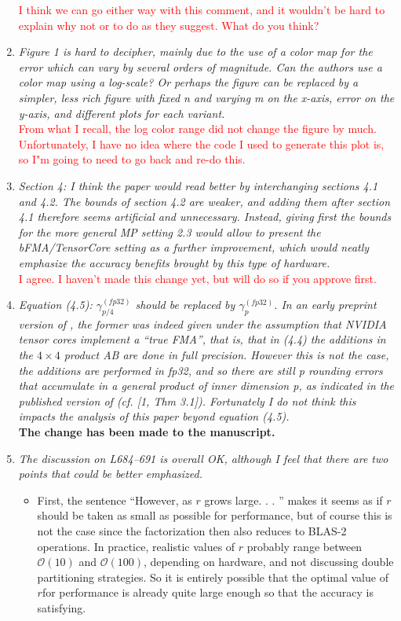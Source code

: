 \documentclass[final,onefignum,onetabnum]{siamart190516}
\newcommand{\cO}{\mathcal{O}}
\newcommand{\red}[1]{\textcolor{red}{#1}}
\begin{document}
\begin{enumerate}
    \red{I think we can go either way with this comment, and it wouldn't be hard to explain why not or to do as they suggest. What do you think?}
    \item {\it Figure 1 is hard to decipher, mainly due to the use of a color map for the error which can vary by several orders of magnitude. Can the authors use a color map using a log-scale? Or perhaps the figure can be replaced by a simpler, less rich figure with fixed n and varying m on the x-axis, error on the y-axis, and different plots for each variant.}\\
    \red{From what I recall, the log color range did not change the figure by much. Unfortunately, I have no idea where the code I used to generate this plot is, so I"m going to need to go back and re-do this.}
    \item {\it Section 4: I think the paper would read better by interchanging sections 4.1 and 4.2. The bounds of section 4.2 are weaker, and adding them after section 4.1 therefore seems artificial and unnecessary. Instead, giving first the bounds for the more general MP setting 2.3 would allow to present the bFMA/TensorCore setting as a further improvement, which would neatly emphasize the accuracy benefits brought by this type of hardware.}\\
    \red{I agree. I haven't made this change yet, but will do so if you approve first.}
    \item {\it Equation (4.5): $\gamma_{p/4}^{(fp32)}$ should be replaced by $\gamma_p^{(fp32)}$. In an early preprint version of \cite{Blanchard2020}, the former was indeed given under the assumption that NVIDIA tensor cores implement a “true FMA”, that is, that in (4.4) the additions in the $4\times 4$ product AB are done in full precision. However this is not the case, the additions are performed in fp32, and so there are still p rounding errors that accumulate in a general product of inner dimension p, as indicated in the published version of \cite{Blanchard2020} (cf. [1, Thm 3.1]). Fortunately I do not think this impacts the analysis of this paper beyond equation (4.5).}\\
    {\bf The change has been made to the manuscript.}
    \item {\it The discussion on L684–691 is overall OK, although I feel that there are two points that could be better emphasized.}
    \begin{itemize}
        \item First, the sentence “However, as $r$ grows large. . . ” makes it seems as if $r$ should be taken as small as possible for performance, but of course this is not the case since the factorization then also reduces to BLAS-2 operations. In practice, realistic values of $r$ probably range between $\cO(10)$ and $\cO(100)$, depending on hardware, and not discussing double partitioning strategies. So it is entirely possible that the optimal value of $r$for performance is already quite large enough so that the accuracy is satisfying.

\end{itemize}
\end{enumerate}
\end{document}
